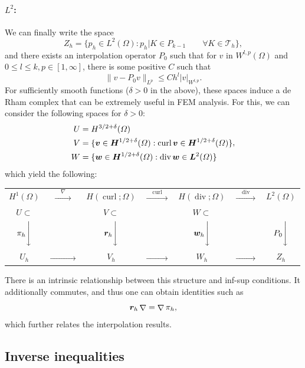 \documentclass{article}
\renewcommand{\vec}{\vectorsym}
\DeclareMathOperator{\grad}{\nabla}
\DeclareMathOperator{\dive}{\text{div}}
\DeclareMathOperator{\curl}{\text{curl}}
\newcommand{\T}{\mathcal{T}}
\begin{document}
\paragraph{$L^2$:} We can finally write the space 
    $$ Z_h = \{ p_h \in L^2(\Omega): p_h|K \in P_{k-1} \qquad \forall K\in \T_h\}, $$
and there exists an interpolation operator $P_0$ such that for $v$ in $W^{l,p}(\Omega)$ and $0\leq l \leq k, p\in[1,\infty]$, there is some positive $C$ such that
    $$ \| v - P_0v\|_{L^p} \leq C h^l |v|_{W^{l,p}}. $$
For sufficiently smooth functions ($\delta>0$ in the above), these spaces induce a de Rham complex that can be extremely useful in FEM analysis. For this, we can consider the following spaces for $\delta > 0$: 
    $$
    \begin{aligned}
        U &= H^{3/2+\delta}(\Omega) \\
        V &= \{\vec v \in \vec H^{1/2+\delta}(\Omega) : \curl \vec v \in \vec H^{1/2+\delta}(\Omega)\} \\
        W &= \{ \vec w \in \vec H^{1/2+\delta}(\Omega): \dive \vec w \in \vec L^2(\Omega) \}
    \end{aligned},
    $$
which yield the following: 

    \begin{center} 
    \begin{tabular}{ccccccc}
    $H^1(\Omega)$ & $\xrightarrow{\quad\nabla\quad}$& $H(\curl;\Omega)$ & $\xrightarrow{\quad\curl\quad}$ & $H(\dive;\Omega)$ & $\xrightarrow{\quad\dive\quad} $ & $L^2(\Omega)$ \\
    $U\subset$ & & $V\subset$ & & $W \subset$ & &  \\
    $\pi_h \Bigg\downarrow$ && $\vec r_h \Bigg\downarrow$ && $\vec w_h\Bigg\downarrow$ && $P_0 \Bigg\downarrow$ \\
    $U_h$ & $\xrightarrow{\quad\phantom{nabla}\quad}$& $V_h$ & $\xrightarrow{\quad\phantom{\curl}\quad}$ & $W_h$ & $\xrightarrow{\quad\phantom{\dive}\quad} $ & $Z_h$ \\
    \end{tabular}
    \end{center} 
There is an intrinsic relationship between this structure and inf-sup conditions. It additionally commutes, and thus one can obtain identities such as 
    $$ \vec r_h \grad = \grad \pi_h, $$
which further relates the interpolation results. 

\subsection{Inverse inequalities}
\end{document}
